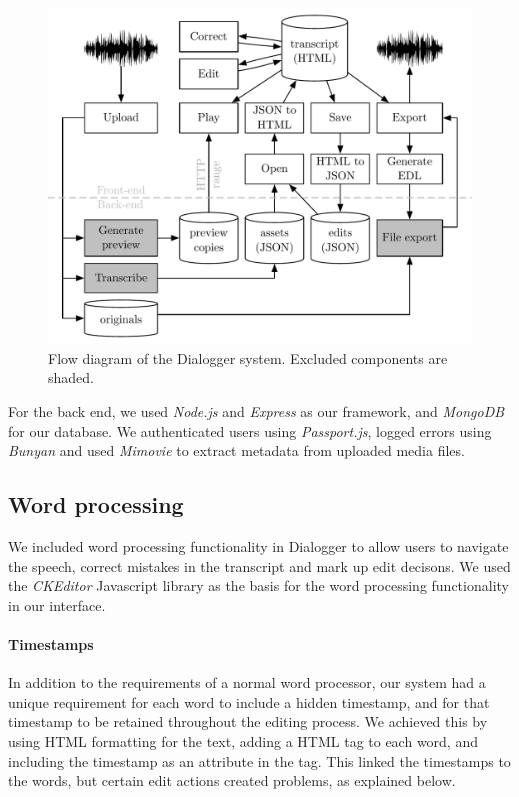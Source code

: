 \begin{figure}[t]
\centering
  \includegraphics[width=.8\textwidth]{figs/dialogger-flow-diagram.pdf}
  \caption{Flow diagram of the Dialogger system. Excluded components are shaded.}
  \label{fig:dialogger-flow}
\end{figure}

For the back end, we used \textit{Node.js} and \textit{Express} as our framework, and \textit{MongoDB} for our
database. We authenticated users using \textit{Passport.js}, logged errors using \textit{Bunyan} and used
\textit{Mimovie} to extract metadata from uploaded media files.

\subsection{Word processing}

We included word processing functionality in Dialogger to allow users to navigate the speech, correct mistakes in the
transcript and mark up edit decisons.  We used the \textit{CKEditor} Javascript library as the basis for the word
processing functionality in our interface.

\paragraph{Timestamps}
In addition to the requirements of a normal word processor, our system had a unique requirement for each word to
include a hidden timestamp, and for that timestamp to be retained throughout the editing process.  We achieved this by
using HTML formatting for the text, adding a HTML tag to each word, and including the timestamp as an attribute in the 
tag. This linked the timestamps to the words, but certain edit actions created problems, as explained below.

